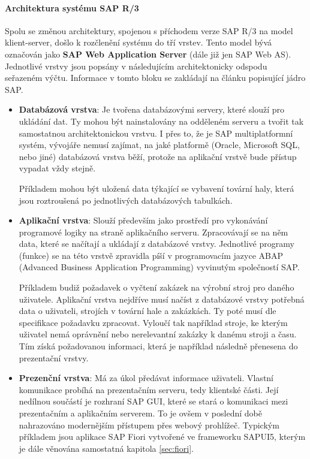 \documentclass[thesis=M,czech]{FITthesis}[2012/06/26]
\begin{document}
\paragraph{Architektura systému SAP R/3}
Spolu se změnou architektury, spojenou s příchodem verze SAP R/3 na model klient-server, došlo k rozčlenění systému do tří vrstev. Tento model bývá označován jako \textbf{SAP Web Application Server} (dále již jen SAP Web AS). Jednotlivé vrstvy jsou popsány v následujícím architektonicky odspodu seřazeném výčtu. Informace v tomto bloku se zakládají na článku \cite{sapcz_blogspot_jadro_sap} popisující jádro SAP.
\begin{itemize}
	\item
	\textbf{Databázová vrstva}: Je tvořena databázovými servery, které slouží pro ukládání dat. Ty mohou být nainstalovány na odděleném serveru a tvořit tak samostatnou architektonickou vrstvu. I přes to, že je SAP multiplatformní systém, vývojáře nemusí zajímat, na jaké platformě (Oracle, Microsoft SQL, nebo jiné) databázová vrstva běží, protože na aplikační vrstvě bude přístup vypadat vždy stejně. 
	
	Příkladem mohou být uložená data týkající se vybavení tovární haly, která jsou roztroušená po jednotlivých databázových tabulkách.
	\item
	\textbf{Aplikační vrstva}: Slouží především jako prostředí pro vykonávání programové logiky na straně aplikačního serveru. Zpracovávají se na něm data, které se načítají a ukládají z databázové vrstvy. Jednotlivé programy (funkce) se na této vrstvě zpravidla píší v programovacím jazyce ABAP (Advanced Business Application Programming) vyvinutým společností SAP. 
	
	Příkladem budiž požadavek o vyčtení zakázek na výrobní stroj pro daného uživatele. Aplikační vrstva nejdříve musí načíst z databázové vrstvy potřebná data o uživateli, strojích v tovární hale a zakázkách. Ty poté musí dle specifikace požadavku zpracovat. Vyloučí tak například stroje, ke kterým uživatel nemá oprávnění nebo nerelevantní zakázky k danému stroji a času. Tím získá požadovanou informaci, která je například následně přenesena do prezentační vrstvy.
	\item
	\textbf{Prezenční vrstva}: Má za úkol předávat informace uživateli. Vlastní komunikace probíhá na prezentačním serveru, tedy klientské části. Její nedílnou součástí je rozhraní SAP GUI, které se stará o komunikaci mezi prezentačním a aplikačním serverem. To je ovšem v poslední době nahrazováno modernějším přístupem přes webový prohlížeč. Typickým příkladem jsou aplikace SAP Fiori vytvořené ve frameworku SAPUI5, kterým je dále věnována samostatná kapitola \ref{sec:fiori}. 
\end{itemize} 	
\end{document}
